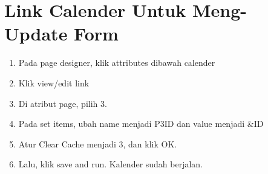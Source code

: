  \section{Link Calender Untuk Meng-Update Form}
 \begin{enumerate}
     \item 	Pada page designer, klik attributes dibawah calender
 \item 	Klik view/edit link
 \item 	Di atribut page, pilih 3.
 \item 	Pada set items, ubah name menjadi P3ID dan value menjadi &ID
 \item 	Atur Clear Cache menjadi 3, dan klik OK.
 \item 	Lalu, klik save and run. Kalender sudah berjalan.

 \end{enumerate}


